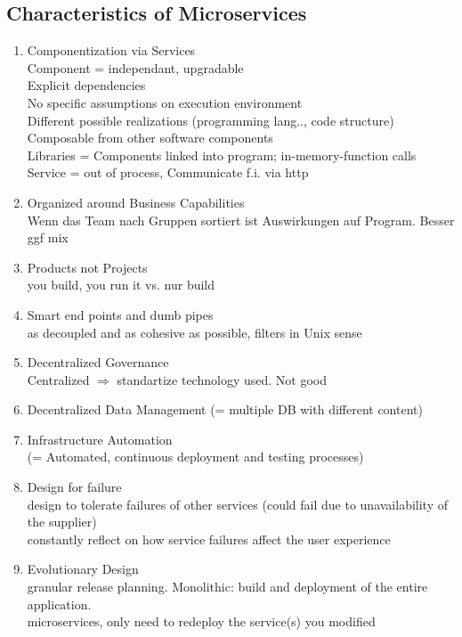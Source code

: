 \documentclass[a4paper,12pt]{article}%
\begin{document}
\subsection{Characteristics of Microservices}
\begin{enumerate}
	\item Componentization via Services\\
	Component = independant, upgradable\\
	\qquad Explicit dependencies
\\$\left . \right .$\qquad No specific assumptions on execution environment
\\$\left . \right .$\qquad Different possible realizations (programming lang.., code structure)
\\$\left . \right .$\qquad Composable from other software components\\
	Libraries = Components linked into program; in-memory-function calls\\
	Service = out of process, Communicate f.i. via http
		\item Organized around Business Capabilities \\
		Wenn das Team nach Gruppen sortiert ist Auswirkungen auf Program. Besser ggf mix
		\item Products not Projects\\
		you build, you run it vs. nur build
	\item Smart end points and dumb pipes\\
	as decoupled and as cohesive as possible, filters in Unix sense
	\item Decentralized Governance\\
	Centralized $\Rightarrow$ standartize technology used. Not good
	\item Decentralized Data Management (= multiple DB with different content)
	\item Infrastructure Automation\\(= Automated, continuous deployment and testing processes)
	\item Design for failure\\
	design to tolerate failures of other services (could fail due to unavailability of the supplier)\\
	constantly reflect on how service failures affect the user experience
	\item Evolutionary Design\\
	granular release planning.
Monolithic: build and deployment of the entire application. \\
microservices, only need to redeploy the service(s) you modified
\end{enumerate}
\end{document}
